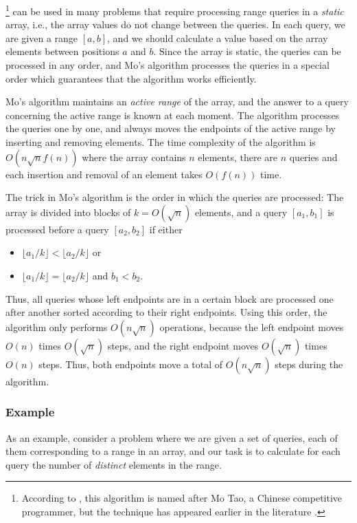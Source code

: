 
\footnote{According to \cite{cod15}, this algorithm
is named after Mo Tao, a Chinese competitive programmer, but
the technique has appeared earlier in the literature \cite{ken06}.}
can be used in many problems
that require processing range queries in 
a \emph{static} array, i.e., the array values
do not change between the queries.
In each query, we are given a range $[a,b]$,
and we should calculate a value based on the
array elements between positions $a$ and $b$.
Since the array is static,
the queries can be processed in any order,
and Mo's algorithm
processes the queries in a special order which guarantees
that the algorithm works efficiently.

Mo's algorithm maintains an \emph{active range}
of the array, and the answer to a query
concerning the active range is known at each moment.
The algorithm processes the queries one by one,
and always moves the endpoints of the
active range by inserting and removing elements.
The time complexity of the algorithm is
$O(n \sqrt n f(n))$ where the array contains
$n$ elements, there are $n$ queries
and each insertion and removal of an element
takes $O(f(n))$ time.

The trick in Mo's algorithm is the order
in which the queries are processed:
The array is divided into blocks of $k=O(\sqrt n)$
elements, and a query $[a_1,b_1]$
is processed before a query $[a_2,b_2]$
if either 
\begin{itemize}
\item $\lfloor a_1/k \rfloor < \lfloor a_2/k \rfloor$ or
\item $\lfloor a_1/k \rfloor = \lfloor a_2/k \rfloor$ and $b_1 < b_2$.
\end{itemize}

Thus, all queries whose left endpoints are
in a certain block are processed one after another
sorted according to their right endpoints.
Using this order, the algorithm
only performs $O(n \sqrt n)$ operations,
because the left endpoint moves
$O(n)$ times $O(\sqrt n)$ steps,
and the right endpoint moves
$O(\sqrt n)$ times $O(n)$ steps. Thus, both
endpoints move a total of $O(n \sqrt n)$ steps during the algorithm.

\subsubsection*{Example}

As an example, consider a problem
where we are given a set of queries,
each of them corresponding to a range in an array,
and our task is to calculate for each query
the number of \emph{distinct} elements in the range.

